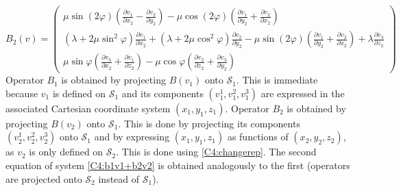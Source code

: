 \begin{equation}
B_2(v)=
\begin{pmatrix}
\mu \sin(2\varphi)\left( \frac{\partial v_1}{\partial x_2}-\frac{\partial v_2}{\partial y_2}\right)-\mu \cos(2\varphi)  \left( \frac{\partial v_1}{\partial y_2}+\frac{\partial v_2}{\partial x_2} \right)\\
(\lambda+2\mu \sin^2\varphi) \frac{\partial v_1}{\partial x_2}+(\lambda+2\mu \cos^2 \varphi)\frac{\partial v_2}{\partial y_2}-\mu \sin(2\varphi)  \left( \frac{\partial v_1}{\partial y_2}+\frac{\partial v_2}{\partial x_2} \right)+\lambda \frac{\partial v_3}{\partial z_2} \\
\mu\sin\varphi\left(\frac{\partial v_3}{\partial x_2}+\frac{\partial v_1}{\partial z_2} \right)-\mu\cos\varphi\left( \frac{\partial v_2}{\partial z_2} +\frac{\partial v_3}{\partial y_2} \right)
\end{pmatrix}
\label{C4:B2v2expl}
\end{equation}
Operator $B_1$ is obtained by projecting $B(v_1)$ onto $\mathcal{S}_1$. This is immediate because $v_1$ is defined on $\mathcal{S}_1$ and its components $(v_1^1,v_1^2,v_1^3)$ are expressed in the associated Cartesian coordinate system $(x_1,y_1,z_1)$. Operator $B_2$ is obtained by projecting $B(v_2)$ onto $\mathcal{S}_1$. This is done by projecting its components $(v_2^1,v_2^2,v_2^3)$ onto $\mathcal{S}_1$ and by expressing $(x_1,y_1,z_1)$ as functions of $(x_2,y_2,z_2)$, as $v_2$ is only defined on $\mathcal{S}_2$. This is done using \eqref{C4:changerep}. The second equation of system \eqref{C4:b1v1+b2v2} is obtained analogously to the first (operators are projected onto $\mathcal{S}_2$ instead of $\mathcal{S}_1$).


